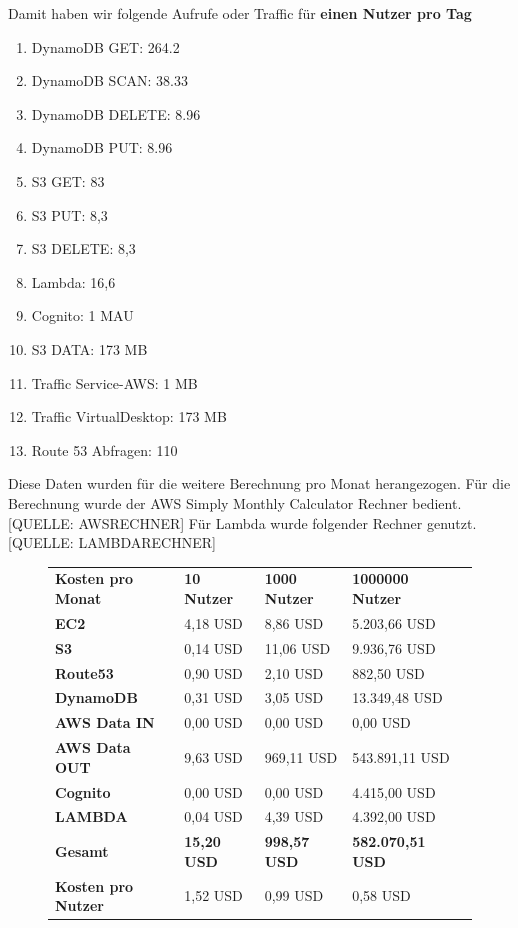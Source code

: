 \documentclass[a4paper, 12pt]{scrreprt}
\renewcommand\_{\textunderscore\allowbreak}
\begin{document}
Damit haben wir folgende Aufrufe oder Traffic für \textbf{einen Nutzer pro Tag}
\begin{enumerate}
\item DynamoDB GET: 264.2
\item DynamoDB SCAN: 38.33
\item DynamoDB DELETE: 8.96
\item DynamoDB PUT: 8.96
\item S3 GET: 83
\item S3 PUT: 8,3
\item S3 DELETE: 8,3
\item Lambda: 16,6
\item Cognito: 1 MAU
\item S3 DATA: 173 MB
\item Traffic Service-AWS: 1 MB
\item Traffic VirtualDesktop: 173 MB
\item Route 53 Abfragen: 110
\end{enumerate}
Diese Daten wurden für die weitere Berechnung pro Monat herangezogen.
Für die Berechnung wurde der AWS Simply Monthly Calculator Rechner bedient. [QUELLE: AWSRECHNER] Für Lambda wurde folgender Rechner genutzt. [QUELLE: LAMBDARECHNER]
\\

\begin{figure}[H]
\begin{tabular}{|l|l|l|l|l}
\cline{1-4}
      \textbf{Kosten pro Monat}    & \textbf{10 Nutzer} & \textbf{1000 Nutzer} & \textbf{1000000 Nutzer} &  \\ \cline{1-4}
\textbf{EC2} & 4,18 USD & 8,86 USD & 5.203,66 USD &  \\ 
\cline{1-4}
\textbf{S3} & 0,14 USD & 11,06 USD &     9.936,76 USD &  \\ 
\cline{1-4}
\textbf{Route53} & 0,90 USD & 2,10 USD & 882,50 USD &  \\ 
\cline{1-4}
\textbf{DynamoDB} & 0,31 USD & 3,05 USD & 13.349,48 USD &  \\ 
\cline{1-4}
\textbf{AWS Data IN} & 0,00 USD & 0,00 USD & 0,00 USD      &  \\ 
\cline{1-4}
\textbf{AWS Data OUT} & 9,63 USD & 969,11 USD & 543.891,11 USD &  \\
\cline{1-4}
\textbf{Cognito} & 0,00 USD & 0,00 USD & 4.415,00 USD &  \\ \cline{1-4}
\textbf{LAMBDA} & 0,04 USD & 4,39 USD & 4.392,00 USD &  \\ \cline{1-4}
\textbf{Gesamt} & \textbf{15,20 USD} & \textbf{998,57 USD} & \textbf{582.070,51 USD} &  \\ \cline{1-4}
\textbf{Kosten pro Nutzer} & 1,52 USD & 0,99 USD & 0,58 USD &  \\ \cline{1-4}
\end{tabular}
\end{figure}
\end{document}
